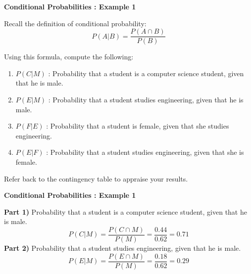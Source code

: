 \documentclass[]{report}
\begin{document}
{
	\textbf{Conditional Probabilities : Example 1}
	
	Recall the definition of conditional probability:
	\[ P(A|B) = \frac{P(A \cap B)}{P(B)} \]
	
	Using this formula, compute the following:
	\begin{enumerate}
		\item $P(C|M)$ : Probability that a student is a computer science student, given that he is male.
		\item $P(E|M)$ : Probability that a student studies engineering, given that he is male.
		\item $P(F|E)$ : Probability that a student is female, given that she studies engineering.
		\item $P(E|F)$ : Probability that a student studies engineering, given that she is female.
	\end{enumerate}
	Refer back to the contingency table to appraise your results.
}
{
	\textbf{Conditional Probabilities : Example 1}
	
	\textbf{Part 1)} Probability that a student is a computer science student, given that he is male.
	\[ P(C|M) = \frac{P(C \cap M)}{P(M)}  = \frac{0.44}{0.62} = 0.71 \]
	\textbf{Part 2)} Probability that a student studies engineering, given that he is male.
	\[ P(E|M) = \frac{P(E \cap M)}{P(M)}  = \frac{0.18}{0.62} = 0.29 \]
	
}
\end{document}
